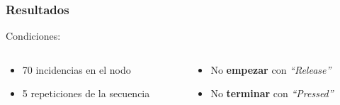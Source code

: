 \begin{frame}
\frametitle{Resultados}

\begin{block}{Condiciones:}
\begin{columns}[T]
\begin{column}{.5\textwidth}
\begin{itemize}
\item {70 incidencias en el nodo}
\item {5 repeticiones de la secuencia}
\end{itemize}
\end{column}

\begin{column}{.5\textwidth}
\begin{itemize}
\item {No \textbf{empezar} con \emph{``Release''}}
\item {No \textbf{terminar} con \emph{``Pressed''}}
\end{itemize}
\end{column}
\end{columns}
\end{block}

\begin{table}[]
\centering

\caption{Resultados con secuencias de una longitud m\'inima de 
 1 acci\'on.}
\label{tableRes1}
\end{table}

\end{frame}


